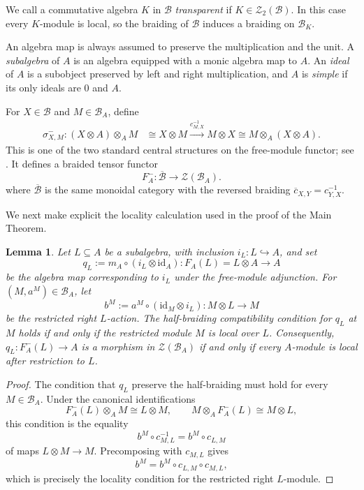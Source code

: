 \documentclass[11pt,reqno]{amsart}
\numberwithin{equation}{section}
\theoremstyle{plain}
\newtheorem{lemma}[thmctr]{Lemma}
\theoremstyle{definition}
\theoremstyle{remark}
\newcommand{\B}{\mathcal{B}}
\newcommand{\Z}{\mathcal{Z}}
\newcommand{\id}{\mathrm{id}}
\newcommand{\oB}{\overline{\B}}
\begin{document}
We call a commutative algebra $K$ in $\B$ \emph{transparent} if
$K\in\Z_2(\B)$. In this case every $K$-module is local, so the braiding of
$\B$ induces a braiding on $\B_K$.

An algebra map is always assumed to preserve the multiplication and the unit.
A \emph{subalgebra} of $A$ is an algebra equipped with a monic algebra map to
$A$. An \emph{ideal} of $A$ is a subobject preserved by left and right
multiplication, and $A$ is \emph{simple} if its only ideals are $0$ and $A$.

For $X\in\B$ and $M\in\B_A$, define
\[
\begin{aligned}
\sigma^-_{X,M}:(X\otimes A)\otimes_A M
&\cong X\otimes M
\xrightarrow{c_{M,X}^{-1}} M\otimes X
\cong M\otimes_A(X\otimes A).
\end{aligned}
\]
This is one of the two standard central structures on the free-module
functor; see
\cite[Exercises~8.8.3--8.8.5 and Proposition~8.8.10]{etingof2016tensor}.
It defines a braided tensor functor
\[
  F_A^-:\oB\longrightarrow\Z(\B_A).
\]
where $\oB$ is the same monoidal category with the reversed braiding $\overline{c}_{X,Y} = c_{Y,X}^{-1}$.

We next make explicit the locality calculation used in the proof of the Main
Theorem.

\begin{lemma}\label{lem:minus-half-braiding-locality}
Let $L\subseteq A$ be a subalgebra, with inclusion $i_L:L\hookrightarrow A$,
and set
\[
  q_L:=m_A\circ(i_L\otimes\id_A):F_A(L)=L\otimes A\longrightarrow A
\]
be the algebra map corresponding to $i_L$ under the free-module adjunction.
For $(M,a^M)\in\B_A$, let
\[
  b^M:=a^M\circ(\id_M\otimes i_L):M\otimes L\longrightarrow M
\]
be the restricted right $L$-action. The half-braiding compatibility condition
for $q_L$ at $M$ holds if and only if the restricted module $M$ is local over
$L$. Consequently, $q_L:F_A^-(L)\to A$ is a morphism in $\Z(\B_A)$ if and
only if every $A$-module is local after restriction to $L$.
\end{lemma}

\begin{proof}
The condition that $q_L$ preserve the half-braiding must hold for every
$M\in\B_A$. Under the canonical identifications
\[
  F_A^-(L)\otimes_A M\cong L\otimes M,
  \qquad
  M\otimes_A F_A^-(L)\cong M\otimes L,
\]
this condition is the equality
\[
  b^M\circ c_{M,L}^{-1}
  =
  b^M\circ c_{L,M}
\]
of maps $L\otimes M\to M$. Precomposing with $c_{M,L}$ gives
\[
  b^M=b^M\circ c_{L,M}\circ c_{M,L},
\]
which is precisely the locality condition for the restricted right
$L$-module.
\end{proof}
\end{document}
